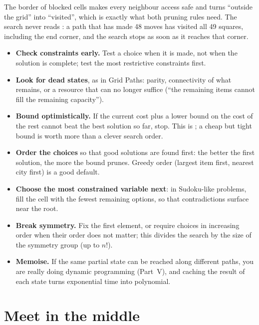 The border of blocked cells makes every neighbour access safe and turns ``outside the grid'' into ``visited'', which is
exactly what both pruning rules need. The search never reads : a path that has made 48 moves has visited all 49
squares, including the end corner, and the search stops as soon as it reaches that corner.

\begin{trick}
\begin{itemize}
  \item \textbf{Check constraints early.} Test a choice when it is made, not when the solution is complete; test the most
        restrictive constraints first.
  \item \textbf{Look for dead states}, as in Grid Paths: parity, connectivity of what remains, or a resource that can no
        longer suffice (``the remaining items cannot fill the remaining capacity'').
  \item \textbf{Bound optimistically.} If the current cost plus a lower bound on the cost of the rest cannot beat the best
        solution so far, stop. This is ; a cheap but tight bound is worth more than a clever search
        order.
  \item \textbf{Order the choices} so that good solutions are found first: the better the first solution, the more the
        bound prunes. Greedy order (largest item first, nearest city first) is a good default.
  \item \textbf{Choose the most constrained variable next}: in Sudoku-like problems, fill the cell with the fewest remaining
        options, so that contradictions surface near the root.
  \item \textbf{Break symmetry.} Fix the first element, or require choices in increasing order when their order does not
        matter; this divides the search by the size of the symmetry group (up to $n!$).
  \item \textbf{Memoise.} If the same partial state can be reached along different paths, you are really doing dynamic
        programming (Part~V), and caching the result of each state turns exponential time into polynomial.
\end{itemize}
\end{trick}

\section[Meet in the middle]{Meet in the middle \hfill \gold}\label{sec:mitm}

